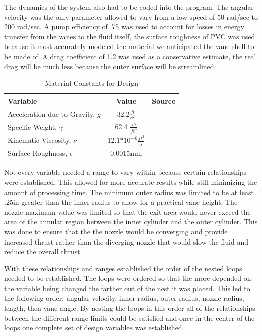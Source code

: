 \documentclass{report}
\begin{document}
The dynamics of the system also had to be coded into the program. The angular velocity was the only parameter allowed to vary from a low speed of 50 rad/sec to 200 rad/sec. A pump efficiency of .75 was used to account for losses in energy transfer from the vanes to the fluid itself, the surface roughness of PVC was used because it most accurately modeled the material we anticipated the vane shell to be made of. A drag coefficient of 1.2 was used as a conservative estimate, the real drag will be much less because the outer surface will be streamlined.\par
\begin{table}[h]
\begin{center}
\begin{tabular}{l|c|c}
Variable&Value& Source\\
\hline
Acceleration due to Gravity, $g$&32.2$\frac{ft}{s^2}$&\cite{munson}\\
Specific Weight, $\gamma$&62.4 $\frac{lb}{ft^3}$&\cite{munson}\\
Kinematic Viscosity, $\nu$&12.1$*10^{-6}\frac{ft^2}{s}$&\cite{munson}\\
Surface Roughness, $\epsilon$&0.0015mm&\cite{munson}\\
\hline 
\end{tabular}
\end{center}
\caption{Material Constants for Design}
\end{table}
Not every variable needed a range to vary within because certain relationships were established. This allowed for more accurate results while still minimizing the amount of processing time. The minimum outer radius was limited to be at least .25in greater than the inner radius to allow for a practical vane height. The nozzle maximum value was limited so that the exit area would never exceed the area of the annular region between the inner cylinder and the outer cylinder. This was done to ensure that the the nozzle would be converging and provide increased thrust rather than the diverging nozzle that would slow the fluid and reduce the overall thrust.  \par
With these relationships and ranges established the order of the nested loops needed to be established. The loops were ordered so that the more depended on the variable being changed the farther out of the nest it was placed. This led to the following order: angular velocity, inner radius, outer radius, nozzle radius, length, then vane angle. By nesting the loops in this order all of the relationships between the different range limits could be satisfied and once in the center of the loops one complete set of design variables was established.\par
\end{document}
